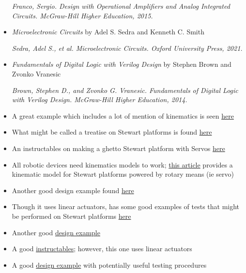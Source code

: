 \documentclass[a4paper, 10pt]{article}
\begin{document}
\begin{itemize}
		\textit{Franco, Sergio. Design with Operational Amplifiers and Analog Integrated Circuits. McGraw-Hill Higher Education, 2015.} 
				
		
		\item \textit{Microelectronic Circuits} by Adel S. Sedra and Kenneth C. Smith
		
		\textit{Sedra, Adel S., et al. Microelectronic Circuits. Oxford University Press, 2021.} 		
		
		\item \textit{Fundamentals of Digital Logic with Verilog Design} by Stephen Brown and Zvonko Vranesic
		
		\textit{Brown, Stephen D., and Zvonko G. Vranesic. Fundamentals of Digital Logic with Verilog Design. McGraw-Hill Higher Education, 2014.} 
		
		\item A great example which includes a lot of mention of kinematics is seen \href{https://ntrs.nasa.gov/api/citations/19910007810/downloads/19910007810.pdf}{here}
		\item What might be called a treatise on Stewart platforms is found \href{https://www.ri.cmu.edu/pub_files/pub4/fong_terrence_w_1990_1/fong_terrence_w_1990_1.pdf}{here}
		\item An instructables on making a ghetto Stewart platform with Servos \href{https://www.instructables.com/Stewart-Platform/}{here}
		\item All robotic devices need kinematics models to work; \href{https://www.xarg.org/paper/inverse-kinematics-of-a-stewart-platform/}{this article} provides a kinematic model for Stewart platforms powered by rotary means (ie servo)
		\item Another good design example found \href{https://iopscience.iop.org/article/10.1088/1757-899X/563/5/052059/pdf}{here}
		\item Though it uses linear actuators, has some good examples of tests that might be performed on Stewart platforms \href{https://www.ncbi.nlm.nih.gov/pmc/articles/PMC6513003/}{here}
		\item Another good \href{https://core.ac.uk/download/pdf/322824733.pdf}{design example}
		\item A good \href{https://www.instructables.com/Six-Axis-Platform-Using-Linear-Actuators-Stewart-P/}{instructables}; however, this one uses linear actuators
		\item A good \href{https://www.ohio.edu/mechanical-faculty/williams/html/PDF/IndRob02.pdf}{design example} with potentially useful testing procedures

\end{itemize}
\end{document}
